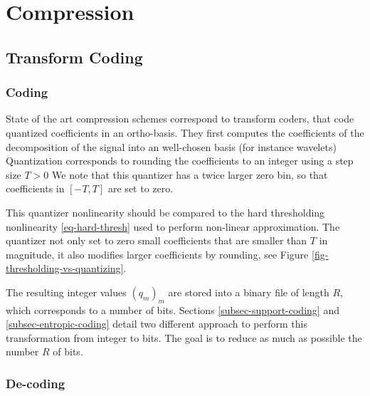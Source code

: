 
\chapter{Compression}


\section{Transform Coding}
\label{sec-transform-coding}

\subsection{Coding}

State of the art compression schemes correspond to transform coders, that code quantized coefficients in an ortho-basis. They first computes the coefficients of the decomposition of the signal into an well-chosen basis (for instance wavelets)
Quantization corresponds to rounding the coefficients to an integer using a step size $T>0$
We note that this quantizer has a twice larger zero bin, so that coefficients in $[-T,T]$ are set to zero.

This quantizer nonlinearity should be compared to the hard thresholding nonlinearity \eqref{eq-hard-thresh} used to perform non-linear approximation. The quantizer not only set to zero small coefficients that are smaller than $T$ in magnitude, it also modifies larger coefficients by rounding, see Figure \ref{fig-thresholding-vs-quantizing}. 


The resulting integer values $(q_m)_m$ are stored into a binary file of length $R$, which corresponds to a number of bits. 
Sections \ref{subsec-support-coding} and \ref{subsec-entropic-coding} detail two different approach to perform this transformation from integer to bits. The goal is to reduce as much as possible the number $R$ of bits. 

\subsection{De-coding}

